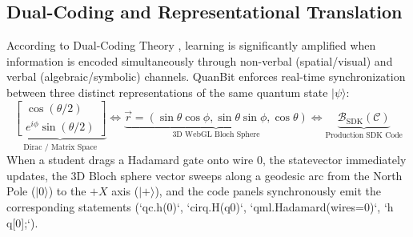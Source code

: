 \documentclass[conference]{IEEEtran}
\begin{document}
\subsection{Dual-Coding and Representational Translation}
According to Dual-Coding Theory \cite{b12}, learning is significantly amplified when information is encoded simultaneously through non-verbal (spatial/visual) and verbal (algebraic/symbolic) channels. QuanBit enforces real-time synchronization between three distinct representations of the same quantum state $|\psi\rangle$:
\begin{equation}
\label{eq:dualcoding}
\underbrace{\begin{bmatrix} \cos(\theta/2) \\ e^{i\phi}\sin(\theta/2) \end{bmatrix}}_{\text{Dirac / Matrix Space}} \iff \underbrace{\vec{r} = (\sin\theta\cos\phi, \sin\theta\sin\phi, \cos\theta)}_{\text{3D WebGL Bloch Sphere}} \iff \underbrace{\mathcal{B}_{\text{SDK}}(\mathcal{C})}_{\text{Production SDK Code}}
\end{equation}
When a student drags a Hadamard gate onto wire 0, the statevector immediately updates, the 3D Bloch sphere vector sweeps along a geodesic arc from the North Pole ($|0\rangle$) to the $+X$ axis ($|+\rangle$), and the code panels synchronously emit the corresponding statements (`qc.h(0)`, `cirq.H(q0)`, `qml.Hadamard(wires=0)`, `h q[0];`).
\end{document}
